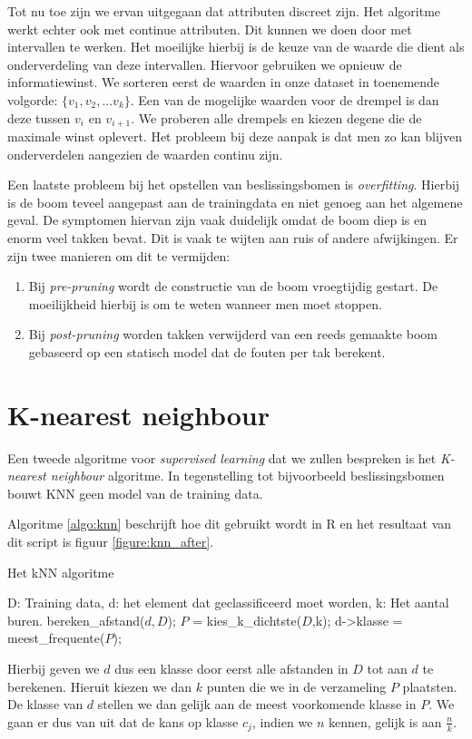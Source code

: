 Tot nu toe zijn we ervan uitgegaan dat attributen discreet zijn. Het algoritme werkt echter ook met continue attributen. Dit kunnen we doen door met intervallen te werken. Het moeilijke hierbij is de keuze van de waarde die dient als onderverdeling van deze intervallen. Hiervoor gebruiken we opnieuw de informatiewinst. We sorteren eerst de waarden in onze dataset in toenemende volgorde: $\{v_1,v_2,...v_k\}$. Een van de mogelijke waarden voor de drempel is dan deze tussen $v_i$ en $v_{i+1}$. We proberen alle drempels en kiezen degene die de maximale winst oplevert. Het probleem bij deze aanpak is dat men zo kan blijven onderverdelen aangezien de waarden continu zijn.

Een laatste probleem bij het opstellen van beslissingsbomen is \emph{overfitting}. Hierbij is de boom teveel aangepast aan de trainingdata en niet genoeg aan het algemene geval. De symptomen hiervan zijn vaak duidelijk omdat de boom diep is en enorm veel takken bevat. Dit is vaak te wijten aan ruis of andere afwijkingen. Er zijn twee manieren om dit te vermijden:
\begin{enumerate}
\item Bij \emph{pre-pruning} wordt de constructie van de boom vroegtijdig gestart. De moeilijkheid hierbij is om te weten wanneer men moet stoppen.
\item Bij \emph{post-pruning} worden takken verwijderd van een reeds gemaakte boom gebaseerd op een statisch model dat de fouten per tak berekent.
\end{enumerate}

\section{K-nearest neighbour}
Een tweede algoritme voor \emph{supervised learning} dat we zullen bespreken is het \emph{K-nearest neighbour} algoritme. In tegenstelling tot bijvoorbeeld beslissingsbomen bouwt KNN geen model van de training data.

Algoritme \ref{algo:knn} beschrijft hoe dit gebruikt wordt in R en het resultaat van dit script is figuur \ref{figure:knn_after}.

\begin{algorithm}
\caption{Het kNN algoritme}
\label{algo:knn}
\begin{algorithmic}[1]
\Require D: Training data, d: het element dat geclassificeerd moet worden, k: Het aantal buren.
	\State bereken\_afstand($d,D$);
    \State $P$ = kies\_k\_dichtste($D$,k);
    \State d->klasse = meest\_frequente($P$);
\EndFunction
\end{algorithmic}
\end{algorithm}
Hierbij geven we $d$ dus een klasse door eerst alle afstanden in $D$ tot aan $d$ te berekenen. Hieruit kiezen we dan $k$ punten die we in de verzameling $P$ plaatsten. De klasse van $d$ stellen we dan gelijk aan de meest voorkomende klasse in $P$. We gaan er dus van uit dat de kans op klasse $c_j$, indien we $n$ kennen, gelijk is aan $\frac{n}{k}$.

